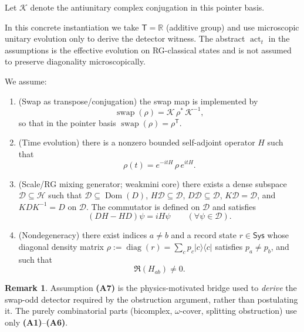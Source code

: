 \documentclass[aps,prl,reprint]{revtex4-2}
\newcommand{\Sys}{\mathsf{Sys}}
\newcommand{\Time}{\mathsf{T}}
\newcommand{\diag}{\operatorname{diag}}
\newcommand{\swap}{\operatorname{swap}}
\newcommand{\actT}{\operatorname{act}_t}
\theoremstyle{definition}
\newtheorem{remark}{Remark}[section]
\theoremstyle{plain}
\begin{document}
\begin{enumerate}[label=\textbf{(A\arabic*)},leftmargin=*,itemsep=0.6em]
\medskip
\noindent
Let $\mathcal K$ denote the antiunitary complex conjugation in this pointer basis.

In this concrete instantiation we take $\Time=\mathbb R$ (additive group) and
use microscopic unitary evolution only to derive the detector witness. The
abstract $\actT$ in the assumptions is the effective evolution on RG-classical
states and is not assumed to preserve diagonality microscopically.

We assume:
\begin{enumerate}[label=\textbf{(A7.\alph*)},leftmargin=*,itemsep=0.4em]
\item (Swap as transpose/conjugation) the swap map is implemented by
\[\swap(\rho)=\mathcal K\,\rho^{\ast}\,\mathcal K^{-1},\]
so that in the pointer basis $\swap(\rho)=\rho^{\mathsf T}$.

\item (Time evolution) there is a nonzero bounded self-adjoint operator $H$ such that
\[\rho(t)=e^{-itH}\,\rho\,e^{itH}.\]

\item (Scale/RG mixing generator; weakmini core) there exists a dense subspace
$\mathcal D\subseteq\mathcal H$ such that $\mathcal D\subseteq\operatorname{Dom}(D)$,
$H\mathcal D\subseteq\mathcal D$, $D\mathcal D\subseteq\mathcal D$, $K\mathcal D=\mathcal D$,
and $KDK^{-1}=D$ on $\mathcal D$. The commutator is defined on $\mathcal D$ and satisfies
\begin{equation}
  (DH-HD)\psi=iH\psi \qquad (\forall\psi\in\mathcal D).
  \label{eq:mixing-comm}
\end{equation}

\item (Nondegeneracy) there exist indices $a\ne b$ and a record state $r\in\Sys$
whose diagonal density matrix $\rho:=\diag(r)=\sum_c p_c\lvert c\rangle\langle c\rvert$
satisfies $p_a\ne p_b$, and such that
\begin{equation}
  \Re(H_{ab})\ne 0.
  \label{eq:nondeg}
\end{equation}
\end{enumerate}

\end{enumerate}

\begin{remark}
\label{rem:limited-scope-theorem-translation-clean-002}
Assumption \textbf{(A7)} is the physics-motivated bridge used to \emph{derive} the
swap-odd detector required by the obstruction argument, rather than postulating it.
The purely combinatorial parts (bicomplex, $\omega$-cover, splitting obstruction)
use only \textbf{(A1)}--\textbf{(A6)}.
\end{remark}
\end{document}
